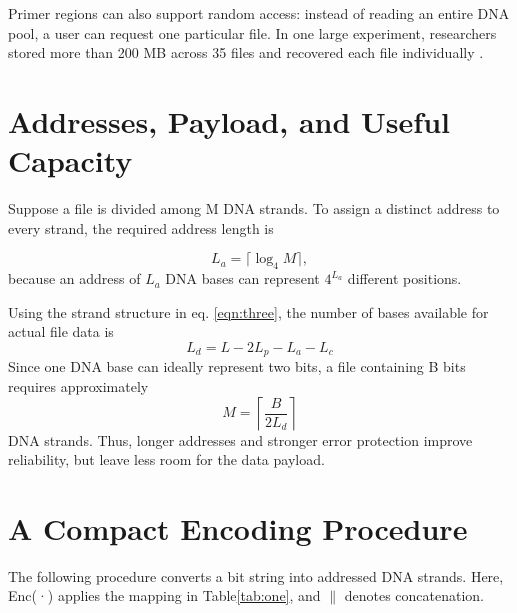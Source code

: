 \documentclass{article}
\begin{document}
Primer regions can also support random access: instead of reading an entire DNA pool, a user can
request one particular file. In one large experiment, researchers stored more than 200 MB across 35
files and recovered each file individually \cite{grass2015}.

\section{Addresses, Payload, and Useful Capacity}
Suppose a file is divided among M DNA strands. To assign a distinct address to every strand, the
required address length is

\begin{equation}
    L_a = \lceil \log_4 M \rceil,
\end{equation}
because an address of $L_a$ DNA bases can represent $4^{L_a}$ different positions.

Using the strand structure in eq. \ref{eqn:three}, the number of bases available for actual file data is
\begin{equation}
    L_d = L - 2L_p - L_a - L_c
\end{equation}
Since one DNA base can ideally represent two bits, a file containing B bits requires approximately
\begin{equation}
    M = \left\lceil \frac{B}{2L_d}  \right\rceil
\end{equation}
DNA strands. Thus, longer addresses and stronger error protection improve reliability, but leave less
room for the data payload.
\section{A Compact Encoding Procedure}
The following procedure converts a bit string into addressed DNA strands. Here, Enc(·) applies the
mapping in Table\ref{tab:one}, and $\parallel$ denotes concatenation.
\end{document}
